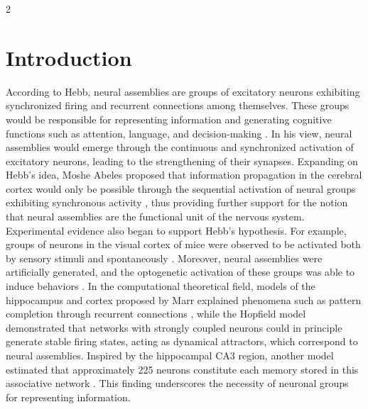 \documentclass[a4paper, 10pt]{article}
\begin{document}
\vspace{.5cm}
\begin{multicols}{2}
    
\section*{Introduction}

According to Hebb, neural assemblies are groups of excitatory neurons exhibiting synchronized firing and recurrent connections among themselves. These groups would be responsible for representing information and generating cognitive functions such as attention, language, and decision-making \cite{hebb_1949}. In his view, neural assemblies would emerge through the continuous and synchronized activation of excitatory neurons, leading to the strengthening of their synapses. Expanding on Hebb’s idea, Moshe Abeles proposed that information propagation in the cerebral cortex would only be possible through the sequential activation of neural groups exhibiting synchronous activity \cite{Abeles_2011}, thus providing further support for the notion that neural assemblies are the functional unit of the nervous system. Experimental evidence also began to support Hebb’s hypothesis. For example, groups of neurons in the visual cortex of mice were observed to be activated both by sensory stimuli \cite{Carrillo-Reid_ensemble2015-gj} and spontaneously \cite{Miller_2014-rs}. Moreover, neural assemblies were artificially generated, and the optogenetic activation of these groups was able to induce behaviors \cite{Carrillo-Reid_impri2016-mc, Carrillo-Reid_control2019-nf}. In the computational theoretical field, models of the hippocampus and cortex proposed by Marr \cite{Marr1970-gx, Marr1971-aq} explained phenomena such as pattern completion through recurrent connections \cite{Yuste_2024}, while the Hopfield model \cite{Hopfield1982-ma} demonstrated that networks with strongly coupled neurons could in principle generate stable firing states, acting as dynamical attractors, which correspond to neural assemblies. Inspired by the hippocampal CA3 region, another model estimated that approximately 225 neurons constitute each memory stored in this associative network \cite{De_Almeida2007-nb}. This finding underscores the necessity of neuronal groups for representing information.


\end{multicols}
\end{document}
